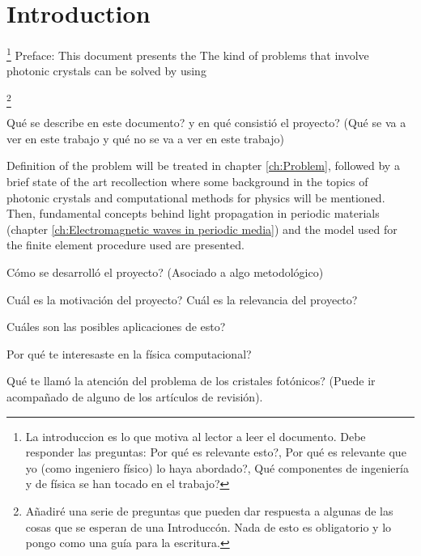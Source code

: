 \cleardoublepage {}
{}
\chapter*{Introduction}

\footnote{La introduccion es lo que motiva al lector a leer el documento. Debe responder las preguntas: Por qu\'e es relevante esto?, Por qu\'e es relevante que yo (como ingeniero f\'isico) lo haya abordado?, Qu\'e componentes de ingenier\'ia y de f\'isica se han tocado en el trabajo?}
Preface:
This document presents the 
The kind of problems that involve photonic crystals can be solved by using 

\footnote{A\~nadir\'e una serie de preguntas que pueden dar respuesta a algunas de las cosas que se esperan de una Introducc\'on. Nada de esto es obligatorio y lo pongo como una gu\'ia para la escritura.}

Qu\'e se describe en este documento? y en qu\'e consisti\'o el proyecto? (Qu\'e se va a ver en este trabajo y qu\'e no se va a ver en este trabajo)


Definition of the problem will be treated in chapter \ref{ch:Problem}, followed by a brief state of the art recollection where some background in the topics of photonic crystals and computational methods for physics will be mentioned. Then, fundamental concepts behind light propagation in periodic materials (chapter \ref{ch:Electromagnetic waves in periodic media})  and the model used for the finite element procedure used are presented.

C\'omo se desarroll\'o el proyecto? (Asociado a algo metodol\'ogico)

Cu\'al es la motivaci\'on del proyecto? Cu\'al es la relevancia del proyecto?

Cu\'ales son las posibles aplicaciones de esto?

Por qu\'e te interesaste en la f\'isica computacional?

Qu\'e te llam\'o la atenci\'on del problema de los cristales fot\'onicos? (Puede ir acompa\~nado de alguno de los art\'iculos de revisi\'on).


